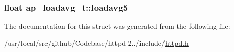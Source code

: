 \subsubsection[{\texorpdfstring{loadavg5}{loadavg5}}]{\setlength{\rightskip}{0pt plus 5cm}float ap\+\_\+loadavg\+\_\+t\+::loadavg5}\hypertarget{structap__loadavg__t_a26e8ad081d9afd8416b47dce84003e12}{}\label{structap__loadavg__t_a26e8ad081d9afd8416b47dce84003e12}


The documentation for this struct was generated from the following file\+:\begin{DoxyCompactItemize}
\item 
/usr/local/src/github/\+Codebase/httpd-\/2../include/\hyperlink{httpd_8h}{httpd.\+h}\end{DoxyCompactItemize}
